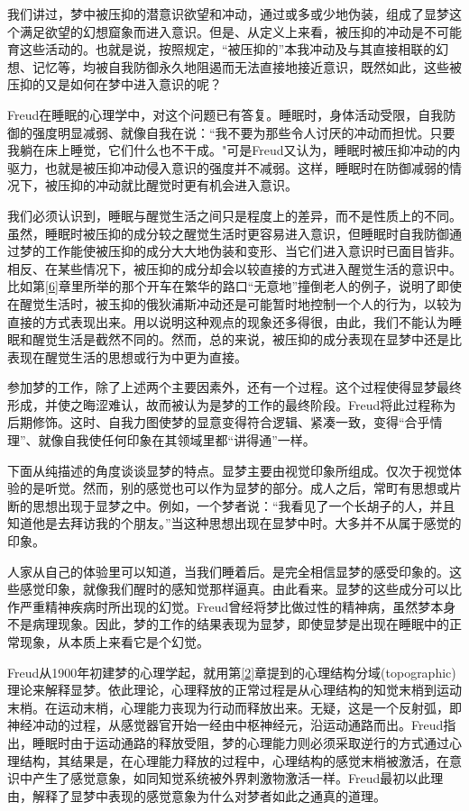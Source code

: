 \documentclass[UTF8,10pt,a4paper,openany]{book}
\begin{document}
我们讲过，梦中被压抑的潜意识欲望和冲动，通过或多或少地伪装，组成了显梦这个满足欲望的幻想窟象而进入意识。但是、从定义上来看，被压抑的冲动是不可能育这些活动的。也就是说，按照规定，“被压抑的”本我冲动及与其直接相联的幻想、记忆等，均被自我防御永久地阻遏而无法直接地接近意识，既然如此，这些被压抑的又是如何在梦中进入意识的呢？

Freud在睡眠的心理学中，对这个问题已有答复。睡眠时，身体活动受限，自我防御的强度明显减弱、就像自我在说：“我不要为那些令人讨厌的冲动而担忧。只要我躺在床上睡觉，它们什么也不干成。"可是Freud又认为，睡眠时被压抑冲动的内驱力，也就是被压抑冲动侵入意识的强度并不减弱。这样，睡眠时在防御减弱的情况下，被压抑的冲动就比醒觉时更有机会进入意识。

我们必须认识到，睡眠与醒觉生活之间只是程度上的差异，而不是性质上的不同。虽然，睡眠时被压抑的成分较之醒觉生活时更容易进入意识，但睡眠时自我防御通过梦的工作能使被压抑的成分大大地伪装和变形、当它们进入意识时已面目皆非。相反、在某些情况下，被压抑的成分却会以较直接的方式进入醒觉生活的意识中。比如第\ref{6}章里所举的那个开车在繁华的路口“无意地”撞倒老人的例子，说明了即使在醒觉生活时，被玉抑的俄狄浦斯冲动还是可能暂时地控制一个人的行为，以较为直接的方式表现出来。用以说明这种观点的现象还多得很，由此，我们不能认为睡眠和醒觉生活是截然不同的。然而，总的来说，被压抑的成分表现在显梦中还是比表现在醒觉生活的思想或行为中更为直接。

参加梦的工作，除了上述两个主要因素外，还有一个过程。这个过程使得显梦最终形成，并使之晦涩难认，故而被认为是梦的工作的最终阶段。Freud将此过程称为后期修饰。这时、自我力图使梦的显意变得符合逻辑、紧凑一致，变得“合乎情理”、就像自我使任何印象在其领域里都“讲得通”一样。

下面从纯描述的角度谈谈显梦的特点。显梦主要由视觉印象所组成。仅次于视觉体验的是听觉。然而，别的感觉也可以作为显梦的部分。成人之后，常町有思想或片断的思想出现于显梦之中。例如，一个梦者说：“我看见了一个长胡子的人，并且知道他是去拜访我的个朋友。”当这种思想出现在显梦中时。大多并不从属于感觉的印象。

人家从自己的体验里可以知道，当我们睡着后。是完全相信显梦的感受印象的。这些感觉印象，就像我们醒时的感知觉那样逼真。由此看来。显梦的这些成分可以比作严重精神疾病时所出现的幻觉。Freud曾经将梦比做过性的精神病，虽然梦本身不是病理现象。因此，梦的工作的结果表现为显梦，即使显梦是出现在睡眠中的正常现象，从本质上来看它是个幻觉。

Freud从1900年初建梦的心理学起，就用第\ref{2}章提到的心理结构分域(topographic)理论来解释显梦。依此理论，心理释放的正常过程是从心理结构的知觉末梢到运动末梢。在运动末梢，心理能力丧现为行动而释放出来。无疑，这是一个反射弧，即神经冲动的过程，从感觉器官开始一经由中枢神经元，沿运动通路而出。Freud指出，睡眠时由于运动通路的释放受阻，梦的心理能力则必须采取逆行的方式通过心理结构，其结果是，在心理能力释放的过程中，心理结构的感觉末梢被激活，在意识中产生了感觉意象，如同知觉系统被外界刺激物激活一样。Freud最初以此理由，解释了显梦中表现的感觉意象为什么对梦者如此之通真的道理。
\end{document}
